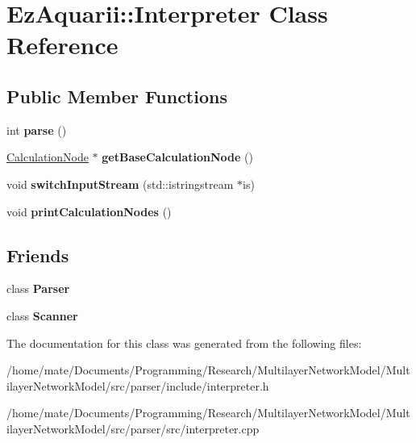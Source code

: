 \hypertarget{classEzAquarii_1_1Interpreter}{}\section{Ez\+Aquarii\+:\+:Interpreter Class Reference}
\label{classEzAquarii_1_1Interpreter}
\subsection*{Public Member Functions}
\begin{DoxyCompactItemize}
\item 
int {\bfseries parse} ()\hypertarget{classEzAquarii_1_1Interpreter_aa88f207642eaa0a2d04cf5d050957c1a}{}\label{classEzAquarii_1_1Interpreter_aa88f207642eaa0a2d04cf5d050957c1a}

\item 
\hyperlink{classCalculationNode}{Calculation\+Node} $\ast$ {\bfseries get\+Base\+Calculation\+Node} ()\hypertarget{classEzAquarii_1_1Interpreter_ac861c17080e13412300574e96612d114}{}\label{classEzAquarii_1_1Interpreter_ac861c17080e13412300574e96612d114}

\item 
void {\bfseries switch\+Input\+Stream} (std\+::istringstream $\ast$is)\hypertarget{classEzAquarii_1_1Interpreter_a4dc3765926d0bf9d103859f713bd1e32}{}\label{classEzAquarii_1_1Interpreter_a4dc3765926d0bf9d103859f713bd1e32}

\item 
void {\bfseries print\+Calculation\+Nodes} ()\hypertarget{classEzAquarii_1_1Interpreter_ab67d30dbcf20022891d6cd58615db65c}{}\label{classEzAquarii_1_1Interpreter_ab67d30dbcf20022891d6cd58615db65c}

\end{DoxyCompactItemize}
\subsection*{Friends}
\begin{DoxyCompactItemize}
\item 
class {\bfseries Parser}\hypertarget{classEzAquarii_1_1Interpreter_ab80291af9c262f63b83fa9c16f12014d}{}\label{classEzAquarii_1_1Interpreter_ab80291af9c262f63b83fa9c16f12014d}

\item 
class {\bfseries Scanner}\hypertarget{classEzAquarii_1_1Interpreter_af4a8f36320cb35fb6b88d6b9a33cb524}{}\label{classEzAquarii_1_1Interpreter_af4a8f36320cb35fb6b88d6b9a33cb524}

\end{DoxyCompactItemize}


The documentation for this class was generated from the following files\+:\begin{DoxyCompactItemize}
\item 
/home/mate/\+Documents/\+Programming/\+Research/\+Multilayer\+Network\+Model/\+Multilayer\+Network\+Model/src/parser/include/interpreter.\+h\item 
/home/mate/\+Documents/\+Programming/\+Research/\+Multilayer\+Network\+Model/\+Multilayer\+Network\+Model/src/parser/src/interpreter.\+cpp\end{DoxyCompactItemize}
